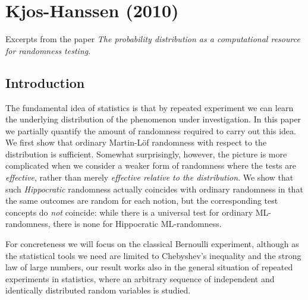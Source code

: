 %
\chapter{Kjos-Hanssen (2010)}
Excerpts from the paper \emph{The probability distribution as a computational resource for randomness testing}.
\section{Introduction}

The fundamental idea of statistics is that by repeated experiment we can learn the underlying distribution of the phenomenon under investigation. In this paper we partially quantify the amount of randomness required to carry out this idea. We first show that ordinary Martin-L\"of randomness with respect to the distribution is sufficient. Somewhat surprisingly, however, the picture is more complicated when we consider a weaker form of randomness where the tests are \emph{effective}, rather than merely \emph{effective relative to the distribution}. We show that such \emph{Hippocratic} randomness actually coincides with ordinary randomness in that the same outcomes are random for each notion, but the corresponding test concepts do \emph{not} coincide: while there is a universal test for ordinary ML-randomness, there is none for Hippocratic ML-randomness.  

For concreteness we will focus on the classical Bernoulli experiment, although as the statistical tools we need are limited to Chebyshev's inequality and the strong law of large numbers, our result works also in  the general situation of repeated experiments in statistics, where an arbitrary sequence of independent and identically distributed random variables is studied. 


